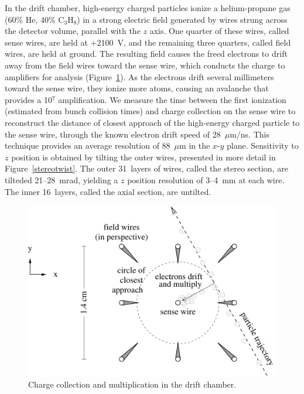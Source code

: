 \documentclass{cornell}
\begin{document}
In the drift chamber, high-energy charged particles ionize a
helium-propane gas (60\% He, 40\% C$_3$H$_8$) in a strong electric
field generated by wires strung across the detector volume, parallel
with the $z$ axis.  One quarter of these wires, called sense wires,
are held at $+$2100~V, and the remaining three quarters, called field
wires, are held at ground.  The resulting field causes the freed
electrons to drift away from the field wires toward the sense wire,
which conducts the charge to amplifiers for analysis
(Figure~\ref{driftcell}).  As the electrons drift several millimeters
toward the sense wire, they ionize more atoms, causing an avalanche
that provides a 10$^7$ amplification.  We measure the time between the
first ionization (estimated from bunch collision times) and charge
collection on the sense wire to reconstruct the distance of closest
approach of the high-energy charged particle to the sense wire,
through the known electron drift speed of 28~$\mu$m/ns.  This
technique provides an average resolution of 88~$\mu$m in the $x$-$y$
plane.  Sensitivity to $z$ position is obtained by tilting the outer
wires, presented in more detail in Figure~\ref{stereotwist}.  The
outer 31~layers of wires, called the stereo section, are tilteded
21--28~mrad, yielding a $z$ position resolution of 3--4~mm at each
wire.  The inner 16~layers, called the axial section, are untilted.

\begin{figure}[p]
  \begin{center}
    \includegraphics[width=0.75\linewidth]{newplots/driftcell}
    \mbox{\hspace{2 cm}}
  \end{center}
  \caption[Charge collection and multiplication in the drift
  chamber]{\label{driftcell} Charge collection and multiplication in
  the drift chamber.}
\end{figure}
\end{document}
